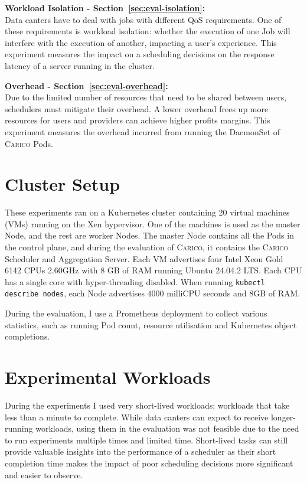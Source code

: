 \textbf{Workload Isolation - Section~\ref{sec:eval-isolation}:}\\
Data canters have to deal with jobs with different QoS requirements. One of
these requirements is workload isolation: whether the execution of one Job will
interfere with the execution of another, impacting a user's experience. This
experiment measures the impact on a scheduling decisions on the response latency
of a server running in the cluster.

\textbf{Overhead - Section~\ref{sec:eval-overhead}:}\\
Due to the limited number of resources that need to be shared between users,
schedulers must mitigate their overhead. A lower overhead frees up more
resources for users and providers can achieve higher profits margins. This
experiment measures the overhead incurred from running the DaemonSet of
\textsc{Carico} Pods.


\section{Cluster Setup}
\label{app:setup-cluster}

These experiments ran on a Kubernetes cluster containing 20 virtual machines
(VMs) running on the Xen hypervisor. One of the machines is used as the master
Node, and the rest are worker Nodes. The master Node contains all the Pods in
the control plane, and during the evaluation of \textsc{Carico}, it contains the \textsc{Carico}
Scheduler and Aggregation Server. Each VM advertises four Intel Xeon Gold 6142
CPUs \@ 2.60GHz with 8 GB of RAM running Ubuntu 24.04.2 LTS. Each CPU has a
single core with hyper-threading disabled. When running \texttt{kubectl describe
nodes}, each Node advertises $4000$ milliCPU seconds and 8GB of RAM.

During the evaluation, I use a Prometheus deployment \cite{} to collect various
statistics, such as running Pod count, resource utilisation and Kubernetes
object completions.

%

\section{Experimental Workloads}
\label{app:setup-workloads}
During the experiments I used very short-lived workloads; workloads that take
less than a minute to complete. While data canters can expect to receive
longer-running workloads, using them in the evaluation was not feasible due to
the need to run experiments multiple times and limited time. Short-lived tasks
can still provide valuable insights into the performance of a scheduler as their
short completion time makes the impact of poor scheduling decisions more
significant and easier to observe.

